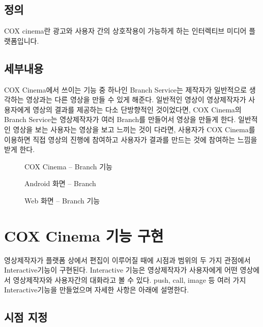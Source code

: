 \documentclass{oblivoir}
\begin{document}
\subsection{정의}

COX cinema란 광고와 사용자 간의 상호작용이 가능하게 하는 인터렉티브 미디어 플랫폼입니다. 	


\subsection{ 세부내용}

COX Cinema에서 쓰이는 기능 중 하나인 Branch Service는 제작자가 일반적으로 생각하는 영상과는 다른 영상을 만들 수 있게 해준다. 일반적인 영상이 영상제작자가 사용자에게 영상의 결과를 제공하는 다소 단방향적인 것이었다면, COX Cinema의 Branch Service는 영상제작자가 여러 Branch를 만들어서 영상을 만들게 한다. 일반적인 영상을 보는 사용자는 영상을 보고 느끼는 것이 다라면, 사용자가 COX Cinema를 이용하면 직접 영상의 진행에 참여하고 사용자가 결과를 만드는 것에 참여하는 느낌을 받게 한다.     

\begin{figure}[h!]
    \centering
    \caption{COX Cinema – Branch 기능}
\end{figure}

\begin{figure}[h!]
    \centering
    \caption{Android 화면 – Branch }
\end{figure}

\begin{figure}[h!]
    \centering
    \caption{Web 화면 – Branch 기능}
\end{figure}


\section{ COX Cinema 기능 구현}
영상제작자가 플랫폼 상에서 편집이 이루어질 때에 시점과 범위의 두 가지 관점에서 Interactive기능이 구현된다. Interactive 기능은 영상제작자가 사용자에게 어떤 영상에서 영상제작자와 사용자간의 대화라고 볼 수 있다. push, call, image 등 여러 가지 Interactive기능을 만들었으며 자세한 사항은 아래에 설명한다.  
 
\subsection{시점 지정}
\end{document}
